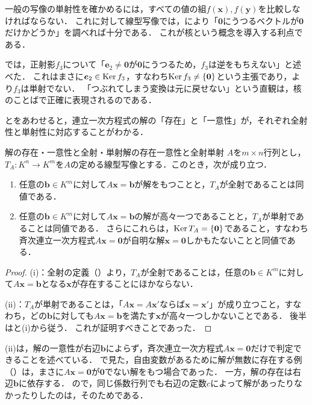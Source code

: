 一般の写像の単射性を確かめるには，すべての値の組$f(\bm{x}),f(\bm{y})$を比較しなければならない．
これに対して線型写像では，により「$\bm{0}$にうつるベクトルが$\bm{0}$だけかどうか」を調べれば十分である．
これが核という概念を導入する利点である．

では，正射影$f_3$について「$\bm{e}_2 \ne \bm{0}$が$\bm{0}$にうつるため，$f_3$は逆をもちえない」と述べた．
これはまさに$\bm{e}_2 \in \operatorname{Ker} f_3$，すなわち$\operatorname{Ker} f_3 \ne \{\bm{0}\}$という主張であり，より$f_3$は単射でない．
「つぶれてしまう変換は元に戻せない」という直観は，核のことばで正確に表現されるのである．

とをあわせると，連立一次方程式の解の「存在」と「一意性」が，それぞれ全射性と単射性に対応することがわかる．

\begin{cor}{解の存在・一意性と全射・単射}{解の存在一意性と全射単射}
  $A$を$m \times n$行列とし，$T_A \colon K^n \to K^m$を$A$の定める線型写像とする．このとき，次が成り立つ．
  \begin{enumerate}[label=(\roman*),leftmargin=3.2em]
    \item 任意の$\bm{b} \in K^m$に対して$A\bm{x} = \bm{b}$が解をもつことと，$T_A$が全射であることは同値である．
    \item 任意の$\bm{b} \in K^m$に対して$A\bm{x} = \bm{b}$の解が高々一つであることと，$T_A$が単射であることは同値である．
      さらにこれらは，$\operatorname{Ker} T_A = \{\bm{0}\}$であること，すなわち斉次連立一次方程式$A\bm{x} = \bm{0}$が自明な解$\bm{x} = \bm{0}$しかもたないことと同値である．
  \end{enumerate}
\end{cor}

\begin{tleftbar}
\begin{proof}
  (i)：全射の定義（）より，$T_A$が全射であることは，任意の$\bm{b} \in K^m$に対して$A\bm{x} = \bm{b}$となる$\bm{x}$が存在することにほかならない．

  (ii)：$T_A$が単射であることは，「$A\bm{x} = A\bm{x}'$ならば$\bm{x} = \bm{x}'$」が成り立つこと，すなわち，どの$\bm{b}$に対しても$A\bm{x} = \bm{b}$を満たす$\bm{x}$が高々一つしかないことである．
  後半はと(i)から従う．
  これが証明すべきことであった．
\end{proof}
\end{tleftbar}

(ii)は，解の一意性が右辺$\bm{b}$によらず，斉次連立一次方程式$A\bm{x} = \bm{0}$だけで判定できることを述べている．
で見た，自由変数があるために解が無数に存在する例（）は，まさに$A\bm{x} = \bm{0}$が$\bm{0}$でない解をもつ場合であった．
一方，解の存在は右辺$\bm{b}$に依存する．
ので，同じ係数行列でも右辺の定数$c$によって解があったりなかったりしたのは，そのためである．

